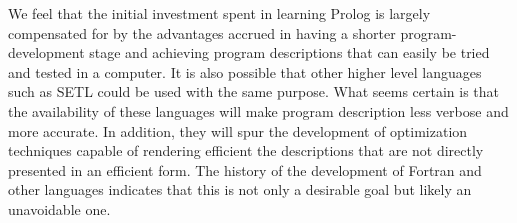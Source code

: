 We feel that the initial investment spent in learning Prolog is largely compensated
for by the advantages accrued in having a shorter program-development
stage and achieving program descriptions that can easily be tried and tested in a
computer. It is also possible that other higher level languages such as SETL
could be used with the same purpose. What seems certain is that the availability
of these languages will make program description less verbose and more accurate.
In addition, they will spur the development of optimization techniques capable
of rendering efficient the descriptions that are not directly presented in an
efficient form. The history of the development of Fortran and other languages
indicates that this is not only a desirable goal but likely an unavoidable one. 

